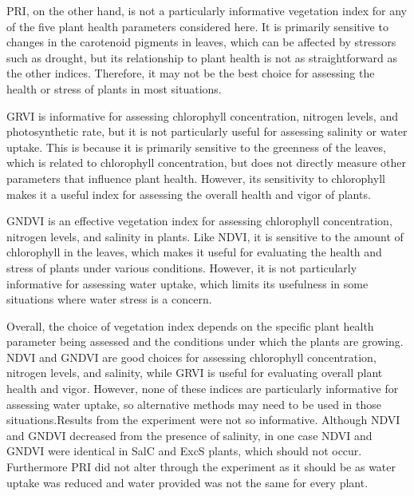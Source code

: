 \documentclass{article}
\begin{document}
                    PRI, on the other hand, is not a particularly informative vegetation index for any of the five plant health parameters considered here. It is primarily sensitive to changes in the carotenoid pigments in leaves, which can be affected by stressors such as drought, but its relationship to plant health is not as straightforward as the other indices. Therefore, it may not be the best choice for assessing the health or stress of plants in most situations.\par
                    \vspace*{1\baselineskip}

                    GRVI is informative for assessing chlorophyll concentration, nitrogen levels, and photosynthetic rate, but it is not particularly useful for assessing salinity or water uptake. This is because it is primarily sensitive to the greenness of the leaves, which is related to chlorophyll concentration, but does not directly measure other parameters that influence plant health. However, its sensitivity to chlorophyll makes it a useful index for assessing the overall health and vigor of plants.\par
                    \vspace*{1\baselineskip}

                    GNDVI is an effective vegetation index for assessing chlorophyll concentration, nitrogen levels, and salinity in plants. Like NDVI, it is sensitive to the amount of chlorophyll in the leaves, which makes it useful for evaluating the health and stress of plants under various conditions. However, it is not particularly informative for assessing water uptake, which limits its usefulness in some situations where water stress is a concern.\par
                    \vspace*{1\baselineskip}

                    Overall, the choice of vegetation index depends on the specific plant health parameter being assessed and the conditions under which the plants are growing. NDVI and GNDVI are good choices for assessing chlorophyll concentration, nitrogen levels, and salinity, while GRVI is useful for evaluating overall plant health and vigor. However, none of these indices are particularly informative for assessing water uptake, so alternative methods may need to be used in those situations.Results from the experiment were not so informative. Although NDVI and GNDVI decreased from the presence of salinity, in one case NDVI and GNDVI were identical in SalC and ExcS plants, which should not occur. Furthermore PRI did not alter through the experiment as it should be as water uptake was reduced and water provided was not the same for every plant.
                    \newpage
                    
\end{document}
